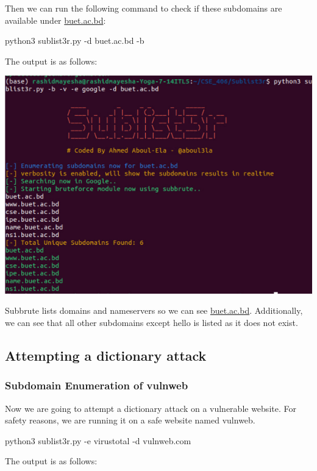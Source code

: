 \documentclass[12pt]{article}
\begin{document}
Then we can run the following command to check if these subdomains are available under \href{http://buet.ac.bd}{buet.ac.bd}:

python3 sublist3r.py -d buet.ac.bd -b

The output is as follows:

\begin{center}
    \includegraphics[max width=\textwidth]{Image6.png}
\end{center}

Subbrute lists domains and nameservers so we can see \href{http://buet.ac.bd}{buet.ac.bd}. Additionally, we can see that all other subdomains except hello is listed as it does not exist.

\subsection{Attempting a dictionary attack}\label{subsec:attempting-a-dictionary-attack}
\subsubsection{Subdomain Enumeration of vulnweb}\label{subsubsec:subdomain-enumeration-of-vulnweb}
Now we are going to attempt a dictionary attack on a vulnerable website. For safety reasons, we are running it on a safe website named vulnweb.

python3 sublist3r.py -e virustotal -d vulnweb.com

The output is as follows:
\end{document}
